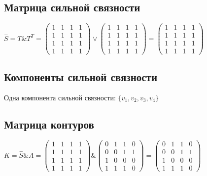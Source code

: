 \subsection{Матрица сильной связности}

$\overset{-}{S} = T \& T^{T} = \begin{pmatrix}
1 & 1 & 1 & 1\\
1 & 1 & 1 & 1\\
1 & 1 & 1 & 1\\
1 & 1 & 1 & 1
\end{pmatrix}\lor\begin{pmatrix}
1 & 1 & 1 & 1\\
1 & 1 & 1 & 1\\
1 & 1 & 1 & 1\\
1 & 1 & 1 & 1
\end{pmatrix} = \begin{pmatrix}
1 & 1 & 1 & 1\\
1 & 1 & 1 & 1\\
1 & 1 & 1 & 1\\
1 & 1 & 1 & 1
\end{pmatrix}$
\subsection{Компоненты сильной связности}
Одна компонента сильной связности: $\{v_1, v_2, v_3, v_4\}$
\subsection{Матрица контуров}
$K = \overset{-}{S}\&A = \begin{pmatrix}
1 & 1 & 1 & 1\\
1 & 1 & 1 & 1\\
1 & 1 & 1 & 1\\
1 & 1 & 1 & 1
\end{pmatrix}\&\begin{pmatrix}
0 & 1 & 1 & 0\\
0 & 0 & 1 & 1\\
1 & 0 & 0 & 0\\
1 & 1 & 1 & 0
\end{pmatrix} = \begin{pmatrix}
0 & 1 & 1 & 0\\
0 & 0 & 1 & 1\\
1 & 0 & 0 & 0\\
1 & 1 & 1 & 0
\end{pmatrix}$
\newpage
